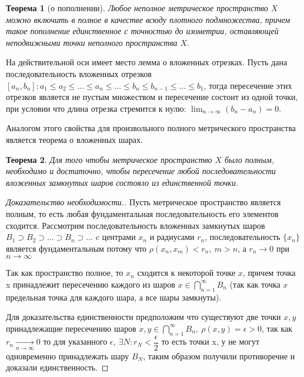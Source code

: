\documentclass[14pt,a4paper]{extarticle}
\newtheorem{theorem}{Теорема}[section]
\theoremstyle{definition}
\theoremstyle{remark}
\renewcommand{\[}{\begin{dmath*}[compact]}
\renewcommand{\]}{\end{dmath*}}
\newcommand{\ds}{\displaystyle}
\newcommand{\sep}{ , \ \allowbreak }
\newcommand\f[2]{\dfrac{#1}{#2}}
\begin{document}
\begin{theorem}[о пополнении]
\label{th:о пополнении}
  Любое неполное метрическое пространство $X$ можно
  включить в полное в качестве всюду плотного подмножества,
  причем такое пополнение единственное с точностью до изометрии,
  оставляющей неподвижными точки неполного пространства $X$.
\end{theorem}

На действительной оси имеет место лемма о вложенных отрезках. Пусть дана
последовательность вложенных отрезков $[a_n, b_n]: a_1 \leq a_2 \leq \dots \leq
a_n \leq \dots \leq b_n \leq b_{n-1} \leq \dots \leq b_1 $, тогда пересечение
этих отрезков является не пустым множеством и пересечение состоит из одной
точки, при условии что длина отрезка стремится к нулю:
$\ds \lim_{n \to \infty}(b_n - a_n) = 0$.

Аналогом этого свойства для произвольного полного метрического пространства
является теорема о вложенных шарах.

\begin{theorem}
  Для того чтобы метрическое пространство $X$ было полным,
  необходимо и достаточно, чтобы пересечение любой последовательности вложенных
  замкнутых шаров состояло из единственной точки.
\end{theorem}

\begin{proof}[Доказательство необходимости.]
  Пусть метрическое пространство является полным, то есть любая фундаментальная
  последовательность его элементов сходится. Рассмотрим последовательность
  вложенных замкнутых шаров
  $B_{1} \supset B_{2} \supset \dots \supset B_{n} \supset \dots$
  c центрами $x_{n}$ и радиусами $r_{n}$, последовательность $\{x_n\}$ является
  фундаментальным потому что $\rho(x_n, x_m) < r_n\sep m > n$,
  а $r_n \to 0$ при $n \to \infty$

  Так как пространство полное, то $x_{n}$ сходится к некоторой точке $x$,
  причем точка x принадлежит пересечению каждого из шаров
  $x \in \bigcap _{n = 1}^{\infty} B_{n}$ (так как точка $x$
  предельная точка для каждого шара, а все шары замкнуты).

  Для доказательства единственности предположим что существуют две точки $x, y$
  принадлежащие пересечению шаров
  $x, y \in \bigcap _{n = 1}^{\infty} B_{n} \sep \rho(x, y) = \epsilon > 0$, так как
  $r_n \underset{n \to \infty}{\to} 0$ то для указанного
  $\epsilon \sep \exists N: r_N < \f\epsilon2$
  то есть точки x, у не могут одновременно принадлежать шару $B_N$, таким образом
  получили противоречие и доказали единственность.
\end{proof}
\end{document}
